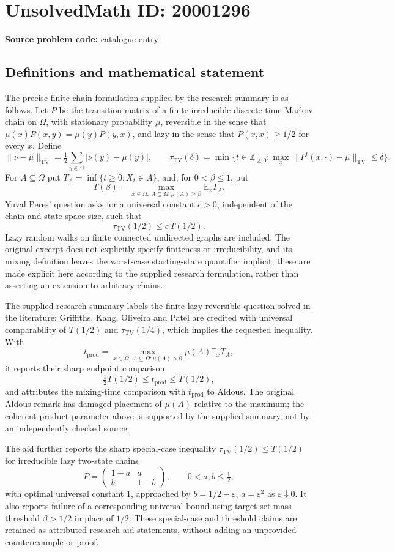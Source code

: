 \documentclass[11pt]{article}
\newcommand{\Z}{\mathbb{Z}}
\newcommand{\E}{\mathbb{E}}
\begin{document}
\section*{UnsolvedMath ID: 20001296}
\textbf{Source problem code:} catalogue entry
\subsection{Definitions and mathematical statement}
The precise finite-chain formulation supplied by the research summary is as follows. Let $P$ be the transition matrix of a finite irreducible discrete-time Markov chain on $\Omega$, with stationary probability $\mu$, reversible in the sense that $\mu(x)P(x,y)=\mu(y)P(y,x)$, and lazy in the sense that $P(x,x)\geq1/2$ for every $x$. Define
\[
 \|\nu-\mu\|_{\mathrm{TV}}=\tfrac12\sum_{y\in\Omega}|\nu(y)-\mu(y)|,
 \qquad
 \tau_{\mathrm{TV}}(\delta)=\min\{t\in\Z_{\geq0}:\max_x\|P^t(x,\cdot)-\mu\|_{\mathrm{TV}}\leq\delta\}.
\]
For $A\subseteq\Omega$ put $T_A=\inf\{t\geq0:X_t\in A\}$, and, for $0<\beta\leq1$, put
\[
 T(\beta)=\max_{x\in\Omega,\ A\subseteq\Omega:\mu(A)\geq\beta}\E_xT_A.
\]
Yuval Peres' question asks for a universal constant $c>0$, independent of the chain and state-space size, such that
\[
 \tau_{\mathrm{TV}}(1/2)\leq c\,T(1/2).
\]
Lazy random walks on finite connected undirected graphs are included. The original excerpt does not explicitly specify finiteness or irreducibility, and its mixing definition leaves the worst-case starting-state quantifier implicit; these are made explicit here according to the supplied research formulation, rather than asserting an extension to arbitrary chains.

The supplied research summary labels the finite lazy reversible question solved in the literature: Griffiths, Kang, Oliveira and Patel are credited with universal comparability of $T(1/2)$ and $\tau_{\mathrm{TV}}(1/4)$, which implies the requested inequality. With
\[
 t_{\mathrm{prod}}=\max_{x\in\Omega,\ A\subseteq\Omega:\mu(A)>0}\mu(A)\E_xT_A,
\]
it reports their sharp endpoint comparison
\[
 \tfrac12 T(1/2)\leq t_{\mathrm{prod}}\leq T(1/2),
\]
and attributes the mixing-time comparison with $t_{\mathrm{prod}}$ to Aldous. The original Aldous remark has damaged placement of $\mu(A)$ relative to the maximum; the coherent product parameter above is supported by the supplied summary, not by an independently checked source.

The aid further reports the sharp special-case inequality $\tau_{\mathrm{TV}}(1/2)\leq T(1/2)$ for irreducible lazy two-state chains
\[
 P=\begin{pmatrix}1-a&a\\b&1-b\end{pmatrix},\qquad 0<a,b\leq\tfrac12,
\]
with optimal universal constant $1$, approached by $b=1/2-\varepsilon$, $a=\varepsilon^2$ as $\varepsilon\downarrow0$. It also reports failure of a corresponding universal bound using target-set mass threshold $\beta>1/2$ in place of $1/2$. These special-case and threshold claims are retained as attributed research-aid statements, without adding an unprovided counterexample or proof.
\end{document}
